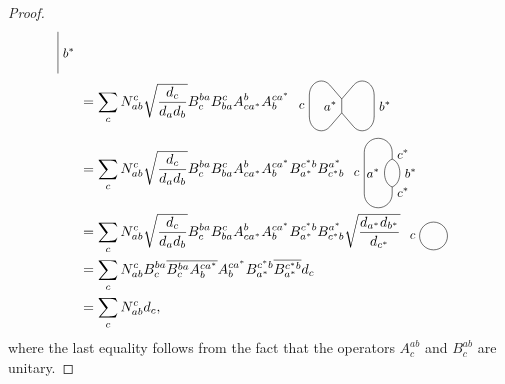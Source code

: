 \begin{proof}
\begin{align}
\begin{tikzpicture}[scale=0.7,baseline=(current bounding box.center)]
				\draw (1,-0.25) to node[right] {\small $b^*$} (1,1.25);
			\end{tikzpicture}\\
			&=\sum_cN_{ab}^c\sqrt{\frac{d_c}{d_ad_b}}B_c^{ba}B_{ba}^cA_{ca^*}^bA_b^{ca^*}\ \begin{tikzpicture}[xscale=0.6,yscale=0.7,baseline=(current bounding box.center)]
				\draw (0,0) to node[left] {\small $a^*$} (0,0.5);
				\draw (0,0.5) -- (0.5,1);
				\draw (0,0.5) -- (-0.5,1);
				\draw (0,0) -- (0.5,-0.5);
				\draw (0,0) -- (-0.5,-0.5);
				\draw (0.5,1) arc (135:0:0.5cm);
				\draw (0.5,-0.5) arc (-135:0:0.5cm);
				\draw (1.355,0.65) to node[right] {\small $b^*$} (1.355,-0.15);
				\begin{scope}[xscale=-1]
					\draw (0.5,1) arc (135:0:0.5cm);
					\draw (0.5,-0.5) arc (-135:0:0.5cm);
					\draw (1.355,0.65) to node[left] {\small $c$} (1.355,-0.15);
				\end{scope}
			\end{tikzpicture}\\
			&=\sum_cN_{ab}^c\sqrt{\frac{d_c}{d_ad_b}}B_c^{ba}B_{ba}^cA_{ca^*}^bA_b^{ca^*}B_{a^*}^{c^*b}B_{c^*b}^{a^*}\ \begin{tikzpicture}[scale=0.7,baseline=(current bounding box.center)]
				\begin{scope}[xscale=-1]
					\draw (0,0) to[bend left=70] node[right] {\small $b^*$} (0,1);
					\draw (0,0) to[bend right=70] node[left] {\small $a^*$} (0,1);
					\draw (0,0) to node [right, near end] {\small $c^*$} (0,-0.25);
					\draw (0,1) to node [right, near end] {\small $c^*$} (0,1.25);
					\draw (0,1.25) arc (180:0:0.5);
					\draw (0,-0.25) arc (-180:0:0.5);
					\draw (1,-0.25) to node[left] {\small $c$} (1,1.25);
				\end{scope}
			\end{tikzpicture}\\
			&=\sum_cN_{ab}^c\sqrt{\frac{d_c}{d_ad_b}}B_c^{ba}B_{ba}^cA_{ca^*}^bA_b^{ca^*}B_{a^*}^{c^*b}B_{c^*b}^{a^*}\sqrt{\frac{d_{a^*}d_{b^*}}{d_{c^*}}}\ 
			\begin{tikzpicture}[scale=0.7,baseline=(current bounding box.center)]
				\draw (0,0) circle (0.5cm);
				\node at (-0.75,0) {\small $c$};
			\end{tikzpicture}\\
			&=\sum_cN_{ab}^cB_c^{ba}\overline{B^{ba}_c}\overline{A^{ca^*}_b} A_b^{ca^*}B_{a^*}^{c^*b}\overline{B^{c^*b}_{a^*}} d_c\\
			&=\sum_cN_{ab}^c d_c,
		\end{align}
	where the last equality follows from the fact that the operators $A_c^{ab}$ and $B_c^{ab}$ are unitary.
\end{proof}

